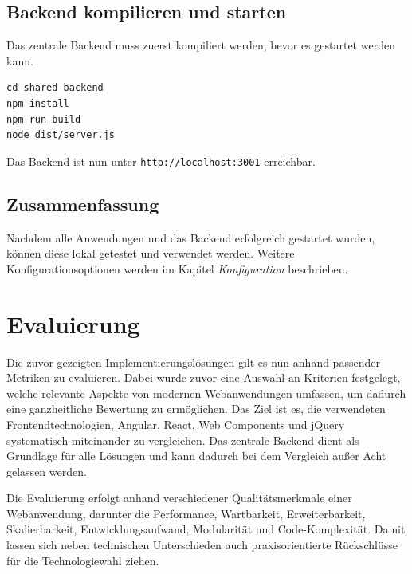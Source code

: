 \documentclass[oneside]{ausarbeitung}
\begin{document}
\section{Backend kompilieren und starten}
Das zentrale Backend muss zuerst kompiliert werden, bevor es gestartet werden kann.

\begin{verbatim}
cd shared-backend
npm install
npm run build
node dist/server.js
\end{verbatim}

Das Backend ist nun unter \texttt{http://localhost:3001} erreichbar.

\section{Zusammenfassung}
Nachdem alle Anwendungen und das Backend erfolgreich gestartet wurden, können diese lokal getestet und verwendet werden. Weitere Konfigurationsoptionen werden im Kapitel \textit{Konfiguration} beschrieben.

\chapter{Evaluierung}

Die zuvor gezeigten Implementierungslösungen gilt es nun anhand passender Metriken zu evaluieren. Dabei wurde zuvor eine Auswahl an Kriterien festgelegt, welche relevante Aspekte von modernen Webanwendungen umfassen, um dadurch eine ganzheitliche Bewertung zu ermöglichen. Das Ziel ist es, die verwendeten Frontendtechnologien, Angular, React, Web Components und jQuery systematisch miteinander zu vergleichen. Das zentrale Backend dient als Grundlage für alle Lösungen und kann dadurch bei dem Vergleich außer Acht gelassen werden.

Die Evaluierung erfolgt anhand verschiedener Qualitätsmerkmale einer Webanwendung, darunter die Performance, Wartbarkeit, Erweiterbarkeit, Skalierbarkeit, Entwicklungsaufwand, Modularität und Code-Komplexität. Damit lassen sich neben technischen Unterschieden auch praxisorientierte Rückschlüsse für die Technologiewahl ziehen. 
\end{document}
